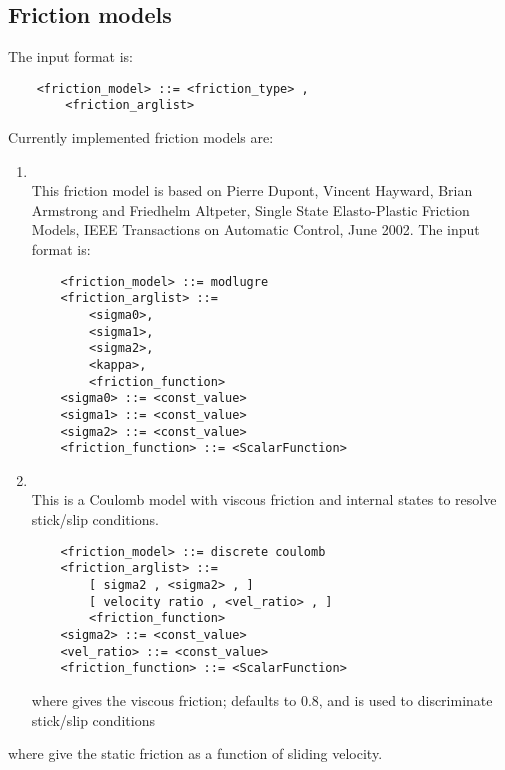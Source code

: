 \subsection{Friction models}
The  input format is:
\begin{verbatim}
    <friction_model> ::= <friction_type> ,
        <friction_arglist>
\end{verbatim}
Currently implemented friction models are:
\begin{enumerate}
    \item {}\\
    This friction model is based on 
    Pierre Dupont, Vincent Hayward, Brian Armstrong and
    Friedhelm Altpeter, Single State Elasto-Plastic Friction Models,
    IEEE Transactions on Automatic Control, June 2002. The input format is:
    \begin{verbatim}
    <friction_model> ::= modlugre
    <friction_arglist> ::=
        <sigma0>,
        <sigma1>,
        <sigma2>,
        <kappa>,
        <friction_function>
    <sigma0> ::= <const_value>
    <sigma1> ::= <const_value>
    <sigma2> ::= <const_value>
    <friction_function> ::= <ScalarFunction>
    \end{verbatim}
    \item {}\\
    This is a Coulomb model with viscous friction and
    internal states to resolve stick/slip conditions.
    \begin{verbatim}
    <friction_model> ::= discrete coulomb
    <friction_arglist> ::=
        [ sigma2 , <sigma2> , ]
        [ velocity ratio , <vel_ratio> , ]
        <friction_function>
    <sigma2> ::= <const_value>
    <vel_ratio> ::= <const_value>
    <friction_function> ::= <ScalarFunction>
    \end{verbatim}
    where  gives the viscous friction;
     defaults to 0.8, and is used
    to discriminate stick/slip conditions
\end{enumerate}
where  give the static friction
as a function of sliding velocity.
